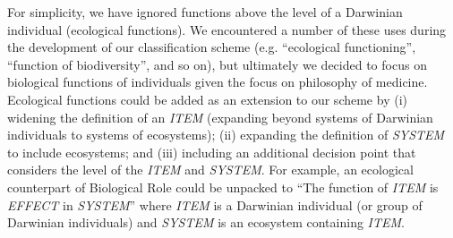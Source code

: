 \documentclass{article}
\begin{document}
For simplicity, we have ignored functions above the level of a Darwinian individual (ecological functions).
We encountered a number of these uses during the development of our classification scheme (e.g. ``ecological functioning'', ``function of biodiversity'', and so on), but ultimately we decided to focus on biological functions of individuals given the focus on philosophy of medicine.
Ecological functions could be added as an extension to our scheme by (i) widening the definition of an \emph{ITEM} (expanding beyond systems of Darwinian individuals to systems of ecosystems); (ii) expanding the definition of \emph{SYSTEM} to include ecosystems; and (iii) including an additional decision point that considers the level of the \emph{ITEM} and \emph{SYSTEM}.
For example, an ecological counterpart of Biological Role could be unpacked to ``The function of \emph{ITEM} is \emph{EFFECT} in \emph{SYSTEM}'' where \emph{ITEM} is a Darwinian individual (or group of Darwinian individuals) and \emph{SYSTEM} is an ecosystem containing \emph{ITEM}.
\end{document}
